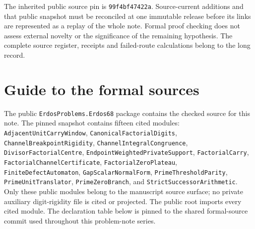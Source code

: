 \documentclass[11pt]{article}
\renewcommand{\commitshort}{99f4bf47422a}
\begin{document}
The inherited public source pin is \texttt{\commitshort}.  Source-current
additions and that public snapshot must be reconciled at one immutable
release before its links are represented as a replay of the whole note.
Formal proof checking does not assess external novelty or the significance
of the remaining hypothesis.  The complete source register, receipts and
failed-route calculations belong to the long record.

\par\endgroup
\appendix
\section{Guide to the formal sources}\label{app:sources}

The public \texttt{ErdosProblems.Erdos68} package contains the checked source
for this note.  The pinned snapshot contains fifteen cited modules:
\texttt{AdjacentUnitCarryWindow},
\texttt{CanonicalFactorialDigits},
\texttt{ChannelBreakpointRigidity},
\texttt{ChannelIntegralCongruence},
\texttt{DivisorFactorialCentre},
\texttt{EndpointWeightedPrivateSupport},
\texttt{FactorialCarry},
\texttt{FactorialChannelCertificate},
\texttt{FactorialZeroPlateau},
\texttt{FiniteDefectAutomaton},
\texttt{GapScalarNormalForm},
\texttt{PrimeThresholdParity},
\texttt{PrimeUnitTranslator},
\texttt{PrimeZeroBranch}, and
\texttt{StrictSuccessorArithmetic}.
Only these public modules belong to the manuscript source surface; no private
auxiliary digit-rigidity file is cited or projected.  The public root imports
every cited module.  The declaration table below is
pinned to the shared formal-source commit used throughout this problem-note
series.
\end{document}
